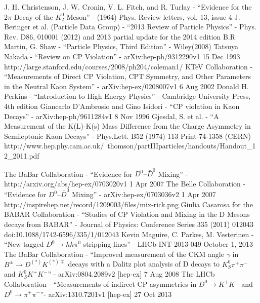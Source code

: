 \documentclass[floatfix,aps,prd,amsmath,amssymb]{revtex4}
\begin{document}
 
\begin{thebibliography}{10}
J. H. Christenson, J. W. Cronin, V. L. Fitch, and R. Turlay - ``Evidence for the $2 \pi$ Decay of the $K^0_2$ Meson'' - (1964) Phys. Review letters, vol. 13, issue 4
J. Beringer et al. (Particle Data Group) - ``2013 Review of Particle Physics'' - Phys. Rev. D86, 010001 (2012) and 2013 partial update for the 2014 edition 
B.R Martin, G. Shaw - ``Particle Physics, Third Edition'' - Wiley(2008)  
Tatsuya Nakada - ``Review on CP Violation'' - arXiv:hep-ph/9312290v1 15 Dec 1993 
http://large.stanford.edu/courses/2008/ph204/coleman1/  
KTeV Collaboration - ``Measurements of Direct CP Violation, CPT Symmetry, and Other Parameters in the Neutral Kaon System'' - arXiv:hep-ex/0208007v1 6 Aug 2002 
Donald H. Perkins - ``Introduction to High Energy Physics'' - Cambridge University Press, 4th edition 
Giancarlo D’Ambrosio and Gino Isidori - ``CP violation in Kaon Decays'' - arXiv:hep-ph/9611284v1 8 Nov 1996
Gjesdal, S. et al. - ``A Measurement of the K(L)-K(s) Mass Difference from the Charge Asymmetry in Semileptonic Kaon Decays'' - Phys.Lett. B52 (1974) 113 Print-74-1358 (CERN) 
http://www.hep.phy.cam.ac.uk/~thomson/partIIIparticles/handouts/Handout\_12\_2011.pdf

The BaBar Collaboration - ``Evidence for $D^{0}–\bar{D}^{0}$ Mixing'' - http://arxiv.org/abs/hep-ex/0703020v1 1 Apr 2007 
The Belle Collaboration - ``Evidence for $D^{0}–\bar{D}^{0}$ Mixing'' - arXiv:hep-ex/0703036v2 1 Apr 2007 
http://inspirehep.net/record/1209003/files/mix-rick.png
Giulia Casarosa for the BABAR Collaboration - ``Studies of CP Violation and Mixing in the D Mesons decays from BABAR'' - Journal of Physics: Conference Series 335 (2011) 012043   doi:10.1088/1742-6596/335/1/012043
Kevin Maguire, C. Parkes, M. Vesterinen - ``New tagged $D^{0} \rightarrow h h \pi^{0}$ stripping lines'' - LHCb-INT-2013-049 October 1, 2013
The BaBar Collaboration - ``Improved measurement of the CKM angle $\gamma$ in $B^{\pm} \rightarrow D^{(*)}K^{(*)\mp}$ decays with a Dalitz plot analysis of D decays to $K^{0}_S \pi^{+} \pi^{-}$ and $K^{0}_{S} K^{+} K^{−}$'' - arXiv:0804.2089v2 [hep-ex] 7 Aug 2008
The LHCb Collaboration - ``Measurements of indirect CP asymmetries in $D^{0} \rightarrow K^{+}K^{-}$ and $D^{0} \rightarrow \pi^{+} \pi^{-}$''- arXiv:1310.7201v1 [hep-ex] 27 Oct 2013



\end{thebibliography}
\end{document}

